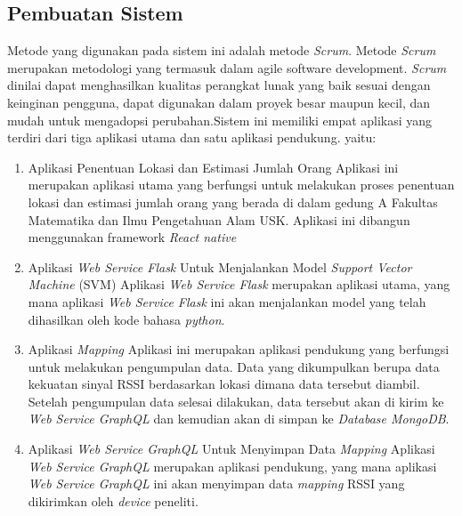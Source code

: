 \subsection{Pembuatan Sistem}
Metode yang digunakan pada sistem ini adalah metode \textit{Scrum}. Metode \textit{Scrum} merupakan metodologi yang termasuk dalam agile software development. \textit{Scrum} dinilai dapat menghasilkan kualitas perangkat lunak yang baik sesuai dengan keinginan pengguna, dapat digunakan dalam proyek besar maupun kecil, dan mudah untuk mengadopsi perubahan.Sistem ini memiliki empat aplikasi yang terdiri dari tiga aplikasi utama dan satu aplikasi pendukung. yaitu:
\begin{enumerate}
	\item Aplikasi Penentuan Lokasi dan Estimasi Jumlah Orang
	      \newline Aplikasi ini merupakan aplikasi utama yang berfungsi untuk melakukan proses penentuan lokasi dan estimasi jumlah orang yang berada di dalam gedung A Fakultas Matematika dan Ilmu Pengetahuan Alam USK. Aplikasi ini dibangun menggunakan framework \textit{React native}

	\item Aplikasi \textit{Web Service Flask} Untuk Menjalankan Model \textit{Support Vector Machine} (SVM)
	      \newline Aplikasi \textit{Web Service Flask} merupakan aplikasi utama, yang mana aplikasi \textit{Web Service Flask} ini akan menjalankan model yang telah dihasilkan oleh kode bahasa \textit{python}.

	\item Aplikasi \textit{Mapping}
	      \newline Aplikasi ini merupakan aplikasi pendukung yang berfungsi untuk melakukan pengumpulan data. Data yang dikumpulkan berupa data kekuatan sinyal RSSI berdasarkan lokasi dimana data tersebut diambil. Setelah pengumpulan data selesai dilakukan, data tersebut akan di kirim ke \textit{Web Service GraphQL} dan kemudian akan di simpan ke \textit{Database MongoDB}.

	\item Aplikasi \textit{Web Service GraphQL} Untuk Menyimpan Data \textit{Mapping}
	      \newline Aplikasi \textit{Web Service GraphQL} merupakan aplikasi pendukung, yang mana aplikasi \textit{Web Service GraphQL} ini akan menyimpan data \textit{mapping} RSSI yang dikirimkan oleh \textit{device} peneliti.

\end{enumerate}

